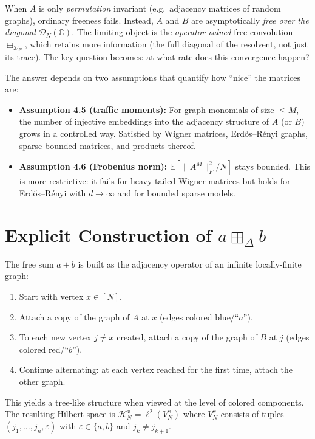 \documentclass[11pt,a4paper]{article}
\begin{document}
When $A$ is only \emph{permutation} invariant (e.g.\ adjacency matrices of random graphs), ordinary freeness fails. Instead, $A$ and $B$ are asymptotically \emph{free over the diagonal} $\mathcal{D}_N(\mathbb{C})$. The limiting object is the \emph{operator-valued} free convolution $\boxplus_{\mathcal{D}_N}$, which retains more information (the full diagonal of the resolvent, not just its trace). The key question becomes: at what rate does this convergence happen?

The answer depends on two assumptions that quantify how ``nice'' the matrices are:
\begin{itemize}
\item \textbf{Assumption 4.5 (traffic moments):} For graph monomials of size $\le M$, the number of injective embeddings into the adjacency structure of $A$ (or $B$) grows in a controlled way. Satisfied by Wigner matrices, Erd\H{o}s--R\'enyi graphs, sparse bounded matrices, and products thereof.
\item \textbf{Assumption 4.6 (Frobenius norm):} $\mathbb{E}[\|A^M\|_F^2/N]$ stays bounded. This is more restrictive: it fails for heavy-tailed Wigner matrices but holds for Erd\H{o}s--R\'enyi with $d\to\infty$ and for bounded sparse models.
\end{itemize}

\section{Explicit Construction of $a\boxplus_\Delta b$}
\label{sec:construction}

The free sum $a+b$ is built as the adjacency operator of an infinite locally-finite graph:

\begin{enumerate}
\item Start with vertex $x\in [N]$.
\item Attach a copy of the graph of $A$ at $x$ (edges colored blue/``$a$'').
\item To each new vertex $j\neq x$ created, attach a copy of the graph of $B$ at $j$ (edges colored red/``$b$'').
\item Continue alternating: at each vertex reached for the first time, attach the other graph.
\end{enumerate}

This yields a tree-like structure when viewed at the level of colored components. The resulting Hilbert space is $\mathcal{H}_N^x = \ell^2(V_N^x)$ where $V_N^x$ consists of tuples $(j_1,\ldots,j_n,\varepsilon)$ with $\varepsilon\in\{a,b\}$ and $j_k\neq j_{k+1}$.
\end{document}
